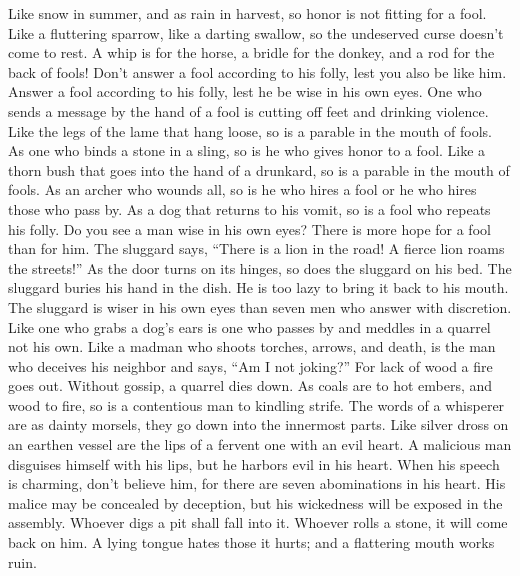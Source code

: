 \begin{paracol}{2}
\begin{otherlanguage}{english}
 Like snow in summer, and as rain in harvest, so honor is
not fitting for a fool.  Like a fluttering sparrow, like a
darting swallow, so the undeserved curse doesn't come to rest.
 A whip is for the horse, a bridle for the donkey, and a
rod for the back of fools!  Don't answer a fool according
to his folly, lest you also be like him.  Answer a fool
according to his folly, lest he be wise in his own eyes. 
One who sends a message by the hand of a fool is cutting off feet and
drinking violence.  Like the legs of the lame that hang
loose, so is a parable in the mouth of fools.  As one who
binds a stone in a sling, so is he who gives honor to a fool.
 Like a thorn bush that goes into the hand of a drunkard,
so is a parable in the mouth of fools.  As an archer who
wounds all, so is he who hires a fool or he who hires those who pass by.
 As a dog that returns to his vomit, so is a fool who
repeats his folly.  Do you see a man wise in his own
eyes? There is more hope for a fool than for him.  The
sluggard says, ``There is a lion in the road! A fierce lion roams the
streets!''  As the door turns on its hinges, so does the
sluggard on his bed.  The sluggard buries his hand in the
dish. He is too lazy to bring it back to his mouth.  The
sluggard is wiser in his own eyes than seven men who answer with
discretion.  Like one who grabs a dog's ears is one who
passes by and meddles in a quarrel not his own.  Like a
madman who shoots torches, arrows, and death,  is the man
who deceives his neighbor and says, ``Am I not joking?'' 
For lack of wood a fire goes out. Without gossip, a quarrel dies down.
 As coals are to hot embers, and wood to fire, so is a
contentious man to kindling strife.  The words of a
whisperer are as dainty morsels, they go down into the innermost parts.
 Like silver dross on an earthen vessel are the lips of a
fervent one with an evil heart.  A malicious man
disguises himself with his lips, but he harbors evil in his heart.
 When his speech is charming, don't believe him, for
there are seven abominations in his heart.  His malice
may be concealed by deception, but his wickedness will be exposed in the
assembly.  Whoever digs a pit shall fall into it. Whoever
rolls a stone, it will come back on him.  A lying tongue
hates those it hurts; and a flattering mouth works ruin.


\end{otherlanguage}
\end{paracol}
